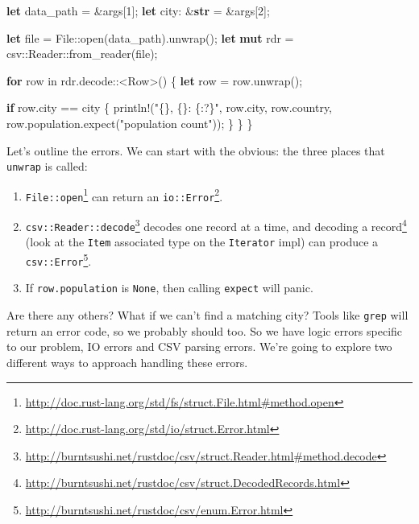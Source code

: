 \documentclass[a4paper,]{book}
\newenvironment{Shaded}{\begin{snugshade}}{\end{snugshade}}
\newcommand{\KeywordTok}[1]{\textcolor[rgb]{0.13,0.29,0.53}{\textbf{{#1}}}}
\newcommand{\DecValTok}[1]{\textcolor[rgb]{0.00,0.00,0.81}{{#1}}}
\newcommand{\StringTok}[1]{\textcolor[rgb]{0.31,0.60,0.02}{{#1}}}
\newcommand{\OtherTok}[1]{\textcolor[rgb]{0.56,0.35,0.01}{{#1}}}
\newcommand{\NormalTok}[1]{{#1}}
\renewcommand{\href}[2]{#2\footnote{\url{#1}}}
\begin{document}
\begin{Shaded}
\begin{Highlighting}[]
    \KeywordTok{let} \NormalTok{data_path = &args[}\DecValTok{1}\NormalTok{];}
    \KeywordTok{let} \NormalTok{city: &}\KeywordTok{str} \NormalTok{= &args[}\DecValTok{2}\NormalTok{];}

    \KeywordTok{let} \NormalTok{file = File::open(data_path).unwrap();}
    \KeywordTok{let} \KeywordTok{mut} \NormalTok{rdr = csv::Reader::from_reader(file);}

    \KeywordTok{for} \NormalTok{row in rdr.decode::<Row>() \{}
        \KeywordTok{let} \NormalTok{row = row.unwrap();}

        \KeywordTok{if} \NormalTok{row.city == city \{}
            \OtherTok{println!}\NormalTok{(}\StringTok{"\{\}, \{\}: \{:?\}"}\NormalTok{,}
                \NormalTok{row.city, row.country,}
                \NormalTok{row.population.expect(}\StringTok{"population count"}\NormalTok{));}
        \NormalTok{\}}
    \NormalTok{\}}
\NormalTok{\}}
\end{Highlighting}
\end{Shaded}

Let's outline the errors. We can start with the obvious: the three
places that \texttt{unwrap} is called:

\begin{enumerate}
\def\labelenumi{\arabic{enumi}.}
\itemsep1pt\parskip0pt
\item
  \href{http://doc.rust-lang.org/std/fs/struct.File.html\#method.open}{\texttt{File::open}}
  can return an
  \href{http://doc.rust-lang.org/std/io/struct.Error.html}{\texttt{io::Error}}.
\item
  \href{http://burntsushi.net/rustdoc/csv/struct.Reader.html\#method.decode}{\texttt{csv::Reader::decode}}
  decodes one record at a time, and
  \href{http://burntsushi.net/rustdoc/csv/struct.DecodedRecords.html}{decoding
  a record} (look at the \texttt{Item} associated type on the
  \texttt{Iterator} impl) can produce a
  \href{http://burntsushi.net/rustdoc/csv/enum.Error.html}{\texttt{csv::Error}}.
\item
  If \texttt{row.population} is \texttt{None}, then calling
  \texttt{expect} will panic.
\end{enumerate}

Are there any others? What if we can't find a matching city? Tools like
\texttt{grep} will return an error code, so we probably should too. So
we have logic errors specific to our problem, IO errors and CSV parsing
errors. We're going to explore two different ways to approach handling
these errors.
\end{document}
